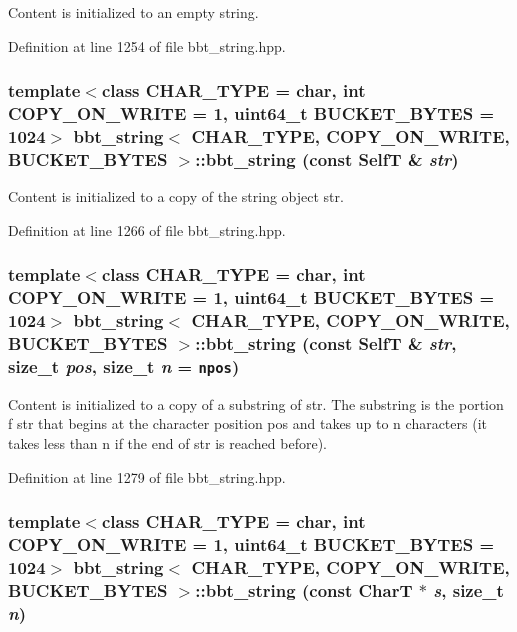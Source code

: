 Content is initialized to an empty string. 

Definition at line 1254 of file bbt\_\-string.hpp.\hypertarget{classbbt__string_3c06fceec11f85e5b3c8f26c624978d4}{
\subsubsection[{bbt\_\-string}]{\setlength{\rightskip}{0pt plus 5cm}template$<$class CHAR\_\-TYPE  = char, int COPY\_\-ON\_\-WRITE = 1, uint64\_\-t BUCKET\_\-BYTES = 1024$>$ {\bf bbt\_\-string}$<$ CHAR\_\-TYPE, COPY\_\-ON\_\-WRITE, BUCKET\_\-BYTES $>$::{\bf bbt\_\-string} (const {\bf SelfT} \& {\em str})}}
\label{classbbt__string_3c06fceec11f85e5b3c8f26c624978d4}


Content is initialized to a copy of the string object str. 

Definition at line 1266 of file bbt\_\-string.hpp.\hypertarget{classbbt__string_77ec72da53ea945e7ede3056319ce609}{
\subsubsection[{bbt\_\-string}]{\setlength{\rightskip}{0pt plus 5cm}template$<$class CHAR\_\-TYPE  = char, int COPY\_\-ON\_\-WRITE = 1, uint64\_\-t BUCKET\_\-BYTES = 1024$>$ {\bf bbt\_\-string}$<$ CHAR\_\-TYPE, COPY\_\-ON\_\-WRITE, BUCKET\_\-BYTES $>$::{\bf bbt\_\-string} (const {\bf SelfT} \& {\em str}, \/  size\_\-t {\em pos}, \/  size\_\-t {\em n} = {\tt npos})}}
\label{classbbt__string_77ec72da53ea945e7ede3056319ce609}


Content is initialized to a copy of a substring of str. The substring is the portion f str that begins at the character position pos and takes up to n characters (it takes less than n if the end of str is reached before). 

Definition at line 1279 of file bbt\_\-string.hpp.\hypertarget{classbbt__string_d759c3a610215f7c52ac7a4c9e13aaab}{
\subsubsection[{bbt\_\-string}]{\setlength{\rightskip}{0pt plus 5cm}template$<$class CHAR\_\-TYPE  = char, int COPY\_\-ON\_\-WRITE = 1, uint64\_\-t BUCKET\_\-BYTES = 1024$>$ {\bf bbt\_\-string}$<$ CHAR\_\-TYPE, COPY\_\-ON\_\-WRITE, BUCKET\_\-BYTES $>$::{\bf bbt\_\-string} (const CharT $\ast$ {\em s}, \/  size\_\-t {\em n})}}
\label{classbbt__string_d759c3a610215f7c52ac7a4c9e13aaab}


